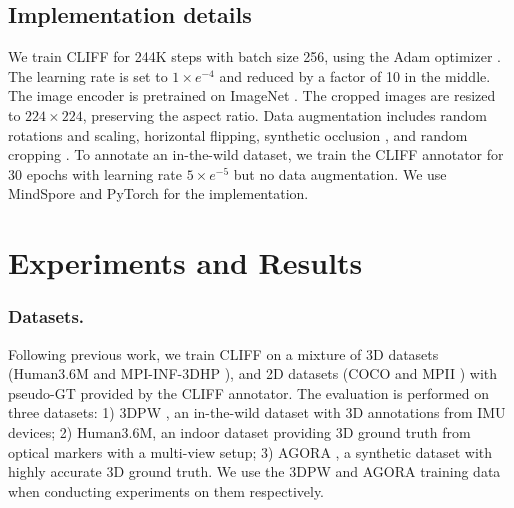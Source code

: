 \documentclass[runningheads]{llncs}
\begin{document}
\subsection{Implementation details}
We train CLIFF for 244K steps with batch size 256, using the Adam optimizer \cite{kingma2015adam}.
The learning rate is set to $1 \times e^{-4}$ and reduced by a factor of 10 in the middle.
The image encoder is pretrained on ImageNet \cite{deng2009imagenet}.
The cropped images are resized to $224 \times 224$, preserving the aspect ratio.
Data augmentation includes random rotations and scaling, horizontal flipping, synthetic occlusion \cite{sarandi2018robust}, and random cropping \cite{joo2021exemplar,rockwell2020full}.
To annotate an in-the-wild dataset, we train the CLIFF annotator for 30 epochs with learning rate $5 \times e^{-5}$ but no data augmentation.
We use MindSpore \cite{ms} and PyTorch \cite{paszke2019pytorch} for the implementation.

\section{Experiments and Results}

\subsubsection{Datasets.}
Following previous work, we train CLIFF on a mixture of 3D datasets (Human3.6M \cite{ionescu2013human3} and MPI-INF-3DHP \cite{mehta2017monocular}), and 2D datasets (COCO \cite{lin2014microsoft} and MPII \cite{andriluka20142d}) with pseudo-GT provided by the CLIFF annotator.
The evaluation is performed on three datasets: 1) 3DPW \cite{von2018recovering}, an in-the-wild dataset with 3D annotations from IMU devices; 2) Human3.6M, an indoor dataset providing 3D ground truth from optical markers with a multi-view setup; 3) AGORA \cite{patel2021agora}, a synthetic dataset with highly accurate 3D ground truth.
We use the 3DPW and AGORA training data when conducting experiments on them respectively.
\end{document}
